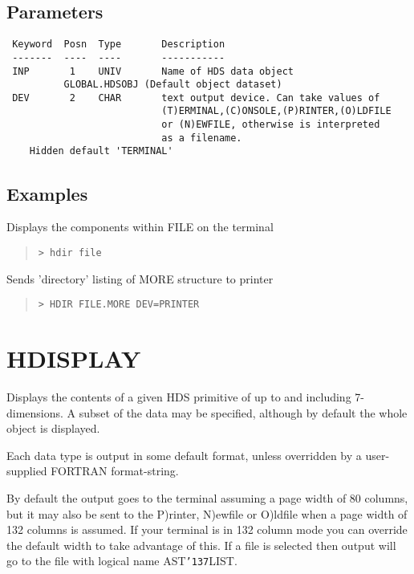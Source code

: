 \documentclass{book}
\renewcommand{\_}{{\tt\char'137}}     %
\begin{document}
\subsection{Parameters}
\begin{verbatim}
 Keyword  Posn  Type       Description
 -------  ----  ----       -----------
 INP       1    UNIV       Name of HDS data object
          GLOBAL.HDSOBJ (Default object dataset)
 DEV       2    CHAR       text output device. Can take values of
                           (T)ERMINAL,(C)ONSOLE,(P)RINTER,(O)LDFILE
                           or (N)EWFILE, otherwise is interpreted
                           as a filename.
    Hidden default 'TERMINAL'

\end{verbatim}\subsection{Examples}
Displays the components within FILE on the terminal
\begin{quote}\begin{verbatim}
> hdir file
\end{verbatim}\end{quote}
Sends 'directory' listing of MORE structure to printer
\begin{quote}\begin{verbatim}
> HDIR FILE.MORE DEV=PRINTER
\end{verbatim}\end{quote}
\section{HDISPLAY}
Displays the contents of a given HDS primitive of up to and
including 7-dimensions. A subset of the data may be specified,
although by default the whole object is displayed.

Each data type is output in some default format, unless
overridden by a user-supplied FORTRAN format-string.

By default the output goes to the terminal assuming a page width
of 80 columns, but it may also be sent to the P)rinter, N)ewfile
or O)ldfile when a page width of 132 columns is assumed. If your
terminal is in 132 column mode you can override the default width
to take advantage of this. If a file is selected then output will
go to the file with logical name AST\_LIST.
\end{document}
